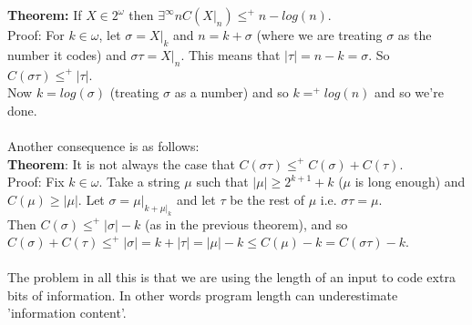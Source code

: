 \documentclass{article}
\begin{document}
	\textbf{Theorem:} If $X \in 2^\omega$ then $\exists^\infty n C(X|_n) \leq^+ n - log(n)$.\\
	Proof: For $k \in \omega$, let $\sigma = X|_k$ and $n = k + \sigma$ (where we are treating $\sigma$ as the number it codes) and $\sigma \tau = X|_n$. This means that $|\tau| = n-k = \sigma$. So $C(\sigma \tau) \leq^+ |\tau|$.\\
	Now $k = log(\sigma)$ (treating $\sigma$ as a number) and so $k =^+ log(n)$ and so we're done.\\
	\\
	Another consequence is as follows:\\
	\textbf{Theorem}: It is not always the case that $C(\sigma \tau) \leq^+ C(\sigma) + C(\tau)$.\\
	Proof: Fix $k \in \omega$. Take a string $\mu$ such that $|\mu| \geq 2^{k+1} +k$ ($\mu$ is long enough) and $C(\mu) \geq |\mu|$. Let $\sigma = \mu|_{k+\mu|_k}$ and let $\tau$ be the rest of $\mu$ i.e. $\sigma \tau = \mu$.\\
	Then $C(\sigma) \leq^+ |\sigma| - k$ (as in the previous theorem), and so $C(\sigma) + C(\tau) \leq^+ |\sigma| = k + |\tau| = |\mu|  - k \leq C(\mu)-k = C(\sigma \tau) - k$.\\
	\\
	The problem in all this is that we are using the length of an input to code extra bits of information. In other words program length can underestimate 'information content'.
\end{document}
